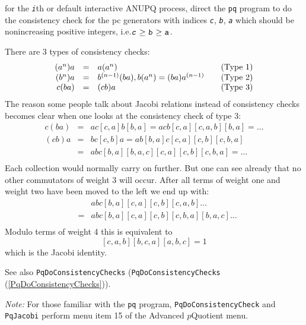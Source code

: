 \documentclass[a4paper,11pt]{report}
\begin{document}
{{{ for the \mbox{\texttt{\mdseries\slshape i}}th or default interactive \textsf{ANUPQ} process, direct the \texttt{pq} program to do the consistency check for the pc generators with indices \mbox{\texttt{\mdseries\slshape c}}, \mbox{\texttt{\mdseries\slshape b}}, \mbox{\texttt{\mdseries\slshape a}} which should be non\texttt{}increasing positive integers,
i.e.{\nobreakspace}$\mbox{\texttt{\mdseries\slshape c}} \ge \mbox{\texttt{\mdseries\slshape b}} \ge \mbox{\texttt{\mdseries\slshape a}}$. 

 There are 3 types of consistency checks: 
\[ \begin{array}{rclrl} (a^n)a &=& a(a^n) && {\rm (Type\ 1)} \\ (b^n)a &=&
b^{(n-1)}(ba), b(a^n) = (ba)a^{(n-1)} && {\rm (Type\ 2)} \\ c(ba) &=& (cb)a &&
{\rm (Type\ 3)} \\ \end{array} \]
 The reason some people talk about Jacobi relations instead of consistency
checks becomes clear when one looks at the consistency check of type 3: 
\[ \begin{array}{rcl} c(ba) &=& a c[c,a] b[b,a] = acb [c,a][c,a,b][b,a] = \dots
\\ (cb)a &=& b c[c,b] a = a b[b,a] c[c,a] [c,b][c,b,a] \\ &=& abc [b,a]
[b,a,c] [c,a] [c,b] [c,b,a] = \dots \\ \end{array} \]
 Each collection would normally carry on further. But one can see already that
no other commutators of weight 3 will occur. After all terms of weight one and
weight two have been moved to the left we end up with: 
\[ \begin{array}{rcl} & &abc [b,a] [c,a] [c,b] [c,a,b] \dots \\ &=&abc [b,a]
[c,a] [c,b] [c,b,a] [b,a,c] \dots \\ \end{array} \]
 Modulo terms of weight 4 this is equivalent to 
\[ [c,a,b] [b,c,a] [a,b,c] = 1 \]
 which is the Jacobi identity. 

 See also \texttt{PqDoConsistencyChecks} (\texttt{PqDoConsistencyChecks} (\ref{PqDoConsistencyChecks})). 

 \emph{Note:} For those familiar with the \texttt{pq} program, \texttt{PqDoConsistencyCheck} and \texttt{PqJacobi} perform menu item 15 of the Advanced $p$\texttt{}Quotient menu. }

 

}}
\end{document}
